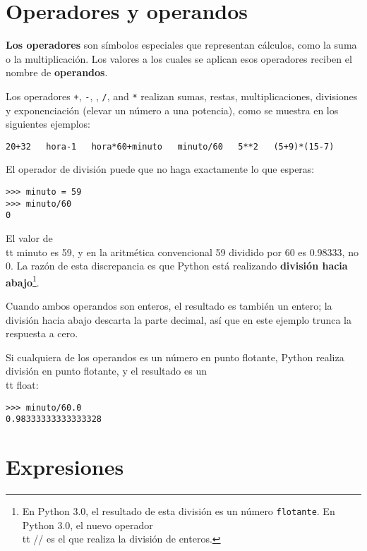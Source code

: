 \section{Operadores y operandos}

{\bf Los operadores} son símbolos especiales que representan cálculos, como
la suma o la multiplicación. Los valores a los cuales se aplican esos operadores
reciben el nombre de {\bf operandos}.

Los operadores {\tt +}, {\tt -}, {\tt *}, {\tt /}, and {\tt **}
realizan sumas, restas, multiplicaciones, divisiones y
exponenciación (elevar un número a una potencia), como se muestra en los siguientes ejemplos:

\beforeverb
\begin{verbatim}
20+32   hora-1   hora*60+minuto   minuto/60   5**2   (5+9)*(15-7)
\end{verbatim}
\afterverb
%
El operador de división puede que no haga exactamente lo que esperas:

\beforeverb
\begin{verbatim}
>>> minuto = 59
>>> minuto/60
0
\end{verbatim}
\afterverb
%
El valor de {\\tt minuto} es 59, y en la aritmética convencional 59
dividido por 60 es 0.98333, no 0. La razón de esta discrepancia es
que Python está realizando {\bf división hacia abajo}\footnote{En Python 3.0,
el resultado de esta división es un número {\tt flotante}.
En Python 3.0, el nuevo operador
{\\tt //} es el que realiza la división de enteros.}.


Cuando ambos operandos son enteros, el resultado es también un
entero; la división hacia abajo descarta la parte decimal,
así que en este ejemplo trunca la respuesta a cero.

Si cualquiera de los operandos es un número en punto flotante, Python realiza
división en punto flotante, y el resultado es un {\\tt float}:

\beforeverb
\begin{verbatim}
>>> minuto/60.0
0.98333333333333328
\end{verbatim}
\afterverb


\section{Expresiones}

